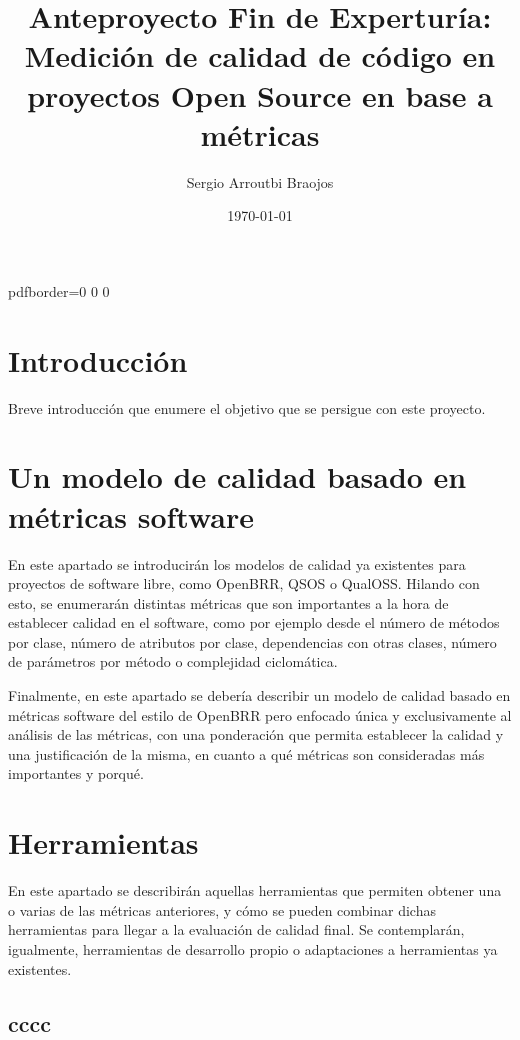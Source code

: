 \documentclass[11pt]{article}
\title{\textbf{Anteproyecto Fin de Experturía: Medición de calidad de código en proyectos Open Source en
base a métricas}}
\author{Sergio Arroutbi Braojos}
\date{\today}
\begin{document}
\hypersetup
{   
pdfborder={0 0 0}
}
   
\maketitle

\pagebreak

\tableofcontents

\pagebreak

\section{Introducción}

Breve introducción que enumere el objetivo que se persigue con este proyecto.

\section{Un modelo de calidad basado en métricas software}

En este apartado se introducirán los modelos de calidad ya existentes para proyectos de software libre, como OpenBRR, QSOS o QualOSS. Hilando con esto, se enumerarán distintas métricas que son importantes a la hora de establecer calidad en el software, como por ejemplo desde el número de métodos por clase, número de atributos por clase, dependencias con otras clases, número de parámetros por método o complejidad ciclomática.

Finalmente, en este apartado se debería describir un modelo de calidad basado en métricas software del estilo de OpenBRR pero enfocado única y exclusivamente al análisis de las métricas, con una ponderación que permita establecer la calidad y una justificación de la misma, en cuanto a qué métricas son consideradas más importantes y porqué.

\section{Herramientas}

En este apartado se describirán aquellas herramientas que permiten obtener una o varias de las métricas anteriores, y cómo se pueden combinar dichas herramientas para llegar a la evaluación de calidad final. Se contemplarán, igualmente, herramientas de desarrollo propio o adaptaciones a herramientas ya existentes.

\subsection{cccc}
\end{document}

